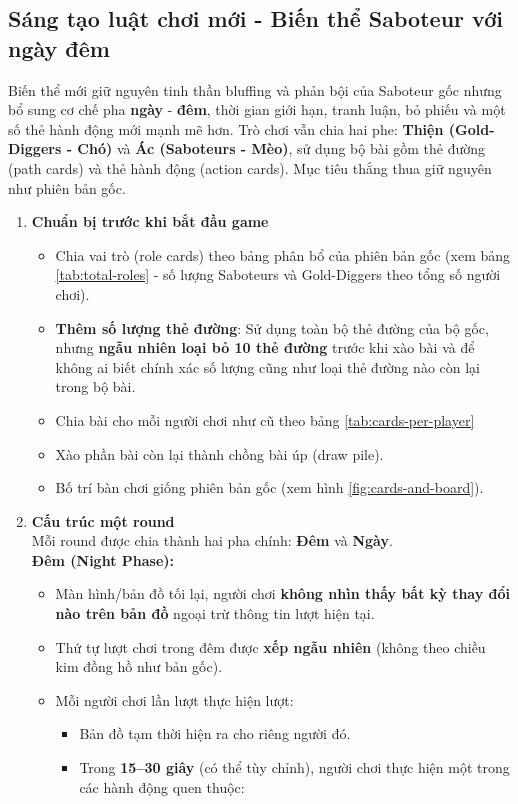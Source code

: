 \subsection{Sáng tạo luật chơi mới - Biến thể Saboteur với  ngày đêm }
Biến thể mới giữ nguyên tinh thần bluffing và phản bội của Saboteur gốc nhưng bổ sung cơ chế pha \textbf{ngày} - \textbf{đêm}, thời gian giới hạn, tranh luận, bỏ phiếu và một số thẻ hành động mới mạnh mẽ hơn. Trò chơi vẫn chia hai phe: \textbf{Thiện (Gold-Diggers - Chó)} và \textbf{Ác (Saboteurs - Mèo)}, sử dụng bộ bài gồm thẻ đường (path cards) và thẻ hành động (action cards). Mục tiêu thắng thua giữ nguyên như phiên bản gốc.
\begin{enumerate}
\item \textbf{Chuẩn bị trước khi bắt đầu game}
\begin{itemize}
\item Chia vai trò (role cards) theo bảng phân bổ của phiên bản gốc (xem bảng \ref{tab:total-roles} - số lượng Saboteurs và Gold-Diggers theo tổng số người chơi).
\item \textbf{Thêm số lượng thẻ đường}: Sử dụng toàn bộ thẻ đường của bộ gốc, nhưng \textbf{ngẫu nhiên loại bỏ 10 thẻ đường} trước khi xào bài và để không ai biết chính xác số lượng cũng như loại thẻ đường nào còn lại trong bộ bài.
\item Chia bài cho mỗi người chơi như cũ theo bảng \ref{tab:cards-per-player} 
\item Xào phần bài còn lại thành chồng bài úp (draw pile).
\item Bố trí bàn chơi giống phiên bản gốc (xem hình \ref{fig:cards-and-board}).
\end{itemize}
\item \textbf{Cấu trúc một round}
\\
Mỗi round được chia thành hai pha chính: \textbf{Đêm} và \textbf{Ngày}.
\\
\textbf{Đêm (Night Phase):}
\begin{itemize}
\item Màn hình/bản đồ tối lại, người chơi \textbf{không nhìn thấy bất kỳ thay đổi nào trên bản đồ} ngoại trừ thông tin lượt hiện tại.
\item Thứ tự lượt chơi trong đêm được \textbf{xếp ngẫu nhiên} (không theo chiều kim đồng hồ như bản gốc).
\item Mỗi người chơi lần lượt thực hiện lượt:
\begin{itemize}
\item Bản đồ tạm thời hiện ra cho riêng người đó.
\item Trong \textbf{15--30 giây} (có thể tùy chỉnh), người chơi thực hiện một trong các hành động quen thuộc:

\end{itemize}
\end{itemize}
\end{enumerate}
